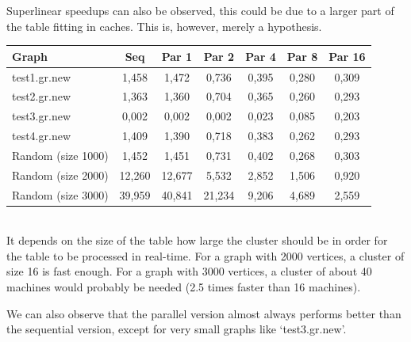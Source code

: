 \documentclass[11pt,a4paper]{article}
\begin{document}
Superlinear speedups can also be observed, this could be due to a larger part of the table fitting in caches. This is, however, merely a hypothesis.

\begin{tabular}{ | l | S | S | S | S | S | S | }
	\hline
	\textbf{Graph} & \textbf{Seq} & \textbf{Par 1} & \textbf{Par 2} & \textbf{Par 4} & \textbf{Par 8} & \textbf{Par 16} \\
	\hline                       
	test1.gr.new & 1,458 & 1,472 & 0,736 & 0,395 & 0,280 & 0,309 \\
	\hline
	test2.gr.new & 1,363 & 1,360 & 0,704 & 0,365 & 0,260 & 0,293 \\
	\hline
	test3.gr.new & 0,002 & 0,002 & 0,002 & 0,023 & 0,085 & 0,203 \\
	\hline
	test4.gr.new & 1,409 & 1,390 & 0,718 & 0,383 & 0,262 & 0,293 \\
	\hline
	Random (size 1000) & 1,452 & 1,451 & 0,731 & 0,402 & 0,268 & 0,303 \\
	\hline
	Random (size 2000) & 12,260 & 12,677 & 5,532 & 2,852 & 1,506 & 0,920 \\
	\hline
	Random (size 3000) & 39,959 & 40,841 & 21,234 & 9,206 & 4,689 & 2,559 \\
	\hline
\end{tabular} \\

It depends on the size of the table how large the cluster should be in order for the table to be processed in real-time. For a graph with 2000 vertices, a cluster of size 16 is fast enough. For a graph with 3000 vertices, a cluster of about 40 machines would probably be needed (2.5 times faster than 16 machines).

We can also observe that the parallel version almost always performs better than the sequential version, except for very small graphs like `test3.gr.new'.
\end{document}
